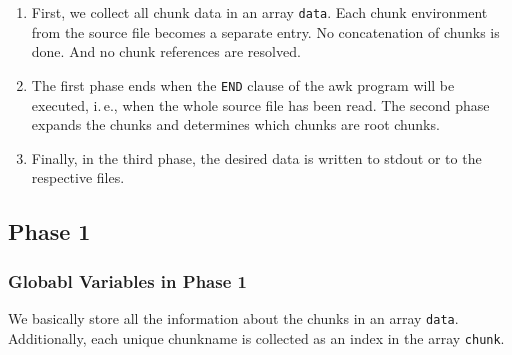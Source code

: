 \documentclass[a4paper]{article} %
\newcommand{\packagename}[1]{{\normalfont\sffamily#1}}
\newcommand{\ie}{i.\,e.}
\begin{document}
\begin{enumerate}
\item First, we collect all chunk data in an array \texttt{data}. Each
  chunk environment from the source file becomes a separate entry. No
  concatenation of chunks is done. And no chunk references are
  resolved.

\item The first phase ends when the \texttt{END} clause of the
  \packagename{awk} program will be executed, \ie, when the whole
  source file has been read.
%
  The second phase expands the chunks and determines which chunks are
  root chunks.

\item Finally, in the third phase, the desired data is written to stdout
  or to the respective files.
\end{enumerate}
\subsection{Phase 1}\label{sec:phase1}
\subsubsection{Globabl Variables in Phase 1}

We basically store all the information about the chunks in an array
\texttt{data}. Additionally, each unique chunkname is collected as an
index in the array \texttt{chunk}.
\end{document}

